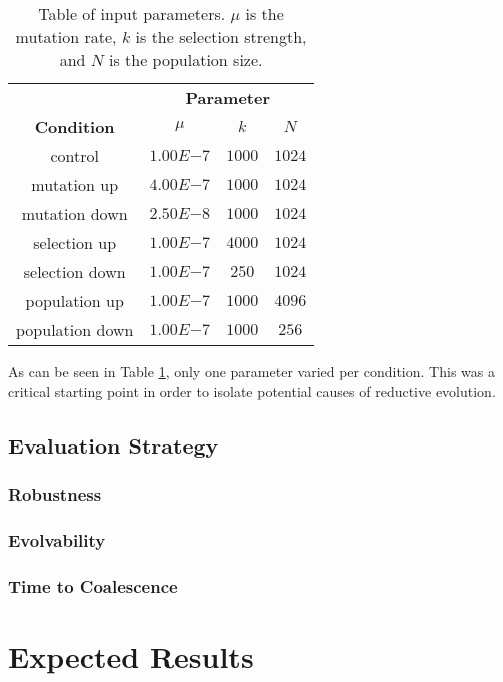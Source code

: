 \begin{table}[h]
	\centering
	\begin{tabular}{|c||c|c|c|}
		\hline
		 & \multicolumn{3}{c|}{\textbf{Parameter}} \\
		\cline{2-4}
		\textbf{Condition} &$\mu$ & $k$ & $N$ \\
		\hline
		control & $1.00E{-7}$ & $1000$ & $1024$ \\
		\hline
		mutation up & $4.00E{-7}$ & $1000$ & $1024$ \\
		\hline
		mutation down & $2.50E{-8}$ & $1000$ & $1024$ \\
		\hline
		selection up & $1.00E{-7}$ & $4000$ & $1024$ \\
		\hline
		selection down & $1.00E{-7}$ & $250$ & $1024$ \\
		\hline
		population up & $1.00E{-7}$ & $1000$ & $4096$ \\
		\hline
		population down & $1.00E{-7}$ & $1000$ & $256$ \\		
		\hline
	\end{tabular}
	\caption[Table of parameters]{Table of input parameters. $\mu$ is the mutation rate, $k$ is the selection strength, and $N$ is the population size.}
	\label{table:parameters}
\end{table}
As can be seen in Table \ref{table:parameters}, only one parameter varied per condition. This was a critical starting point in order to isolate potential causes of reductive evolution. 
\subsection{Evaluation Strategy}
\subsubsection{Robustness}
\subsubsection{Evolvability}
\subsubsection{Time to Coalescence}

\section{Expected Results}





